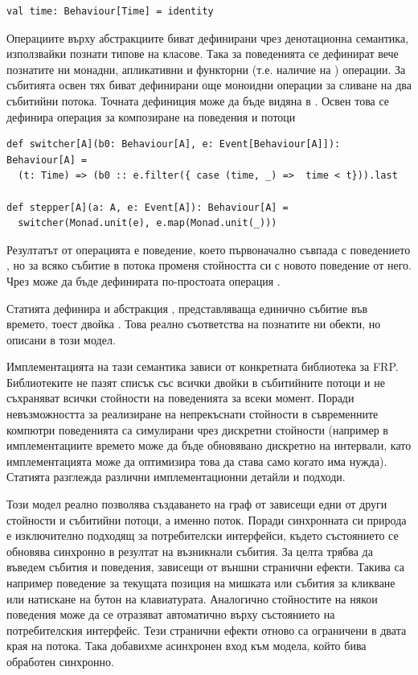 \begin{lstlisting}
val time: Behaviour[Time] = identity
\end{lstlisting}

Операциите върху абстракциите биват дефинирани чрез денотационна семантика, използвайки познати типове на класове. Така за поведенията се дефинират вече познатите ни монадни, апликативни и функторни (т.е. наличие на ) операции. За събитията освен тях биват дефинирани още моноидни операции за сливане на два събитийни потока. Точната дефиниция може да бъде видяна в \cite{elliott2009PushPullFRP}. Освен това се дефинира операция за композиране на поведения и потоци 

\begin{lstlisting}
def switcher[A](b0: Behaviour[A], e: Event[Behaviour[A]]): Behaviour[A] =
  (t: Time) => (b0 :: e.filter({ case (time, _) =>  time < t})).last
  
def stepper[A](a: A, e: Event[A]): Behaviour[A] =
  switcher(Monad.unit(e), e.map(Monad.unit(_)))
\end{lstlisting}

Резултатът от операцията е поведение, което първоначално съвпада с поведението , но за всяко събитие в потока  променя стойността си с новото поведение от него. Чрез  може да бъде дефинирата по-простоата операция .

Статията дефинира и абстракция , представляваща единично събитие във времето, тоест двойка . Това реално съответства на познатите ни  обекти, но описани в този модел.

Имплементацията на тази семантика зависи от конкретната библиотека за FRP. Библиотеките не пазят списък със всички двойки в събитийните потоци и не съхраняват всички стойности на поведенията за всеки момент. Поради невъзможността за реализиране на непрекъснати стойности в съвременните компютри поведенията са симулирани чрез дискретни стойности (например в имплементациите времето може да бъде обновявано дискретно на интервали, като имплементацията може да оптимизира това да става само когато има нужда). Статията разглежда различни имплементационни детайли и подходи.

Този модел реално позволява създаването на граф от зависещи едни от други стойности и събитийни потоци, а именно  поток. Поради синхронната си природа е изключително подходящ за потребителски интерфейси, където състоянието се обновява синхронно в резултат на възникнали събития. За целта трябва да въведем събития и поведения, зависещи от външни странични ефекти. Такива са например поведение за текущата позиция на мишката или събития за кликване или натискане на бутон на клавиатурата. Аналогично стойностите на някои поведения може да се отразяват автоматично върху състоянието на потребителския интерфейс. Тези странични ефекти отново са ограничени в двата края на потока. Така добавихме асинхронен вход към модела, който бива обработен синхронно.

